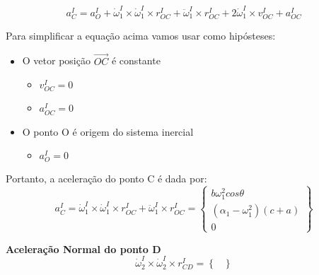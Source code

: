 \documentclass[a4paper, 12pt]{article}
\begin{document}
		\begin{equation}
			a^I_C = a^I_O + \dot{\omega}^I_1 \times \dot{\omega}^I_1 \times r^I_{OC} + \ddot{\omega}^I_1 \times r^I_{OC} + 2 \dot{\omega}^I_1 \times v^I_{OC} + a^I_{OC}
		\end{equation}
		
		Para simplificar a equação acima vamos usar como hipósteses:
		\begin{itemize}
			\item O vetor posição $\vec{OC}$ é constante
				\begin{itemize}
					\item $v^I_{OC} = 0$	
					\item $a^I_{OC} = 0$
				\end{itemize}
			\item O ponto O é origem do sistema inercial
				\begin{itemize}
					\item $a^I_{O} = 0$	
				\end{itemize}								
		\end{itemize}				
		Portanto, a aceleração do ponto C é dada por:
		\begin{equation}
			a^I_C = \dot{\omega}^I_1 \times \dot{\omega}^I_1 \times r^I_{OC} + \ddot{\omega}^I_1 \times r^I_{OC}= \begin{Bmatrix}
			b\omega_1^2 cos \theta\\
			(\alpha_1-\omega_1^2)(c+a)\\
			0
			\end{Bmatrix}
		\end{equation}
		
		\textbf{Aceleração Normal do ponto D}
			\begin{equation}
				\dot{\omega}^I_2 \times \dot{\omega}^I_2 \times r^I_{CD} = \begin{Bmatrix}
					
				\end{Bmatrix}
			\end{equation}
		
		
		
		
		
		
		
		
		
		
		
		
		
		
		
		
		
		
		
		
		
		
		
		
\end{document}
